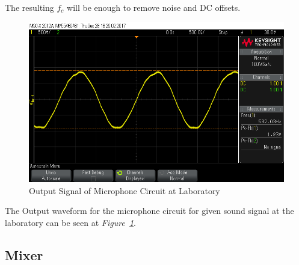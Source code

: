 \documentclass[paper]{IEEEtran}
\begin{document}
The resulting $f_c$ will be enough to remove noise and DC offsets.

\begin{figure}[h!]
\setlength{\unitlength}{\textwidth}
\center 
\includegraphics[width=0.45\unitlength]{mic_osc.png}
\caption{\label{fig:micout} Output Signal of Microphone Circuit at Laboratory }
\end{figure}	

	The Output waveform for the microphone circuit for given sound signal at the laboratory can be seen at \textit{Figure~\ref{fig:micout}}.




	
	
\subsection{Mixer}
	
\end{document}
